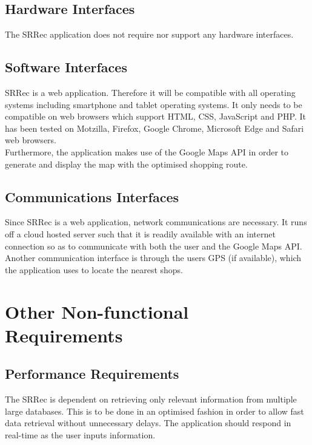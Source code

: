 \documentclass[10pt, a4paper, onecolumn]{scrartcl}
\begin{document}
		\subsection{Hardware Interfaces}
		
			The SRRec application does not require nor support any hardware interfaces.
		
		\subsection{Software Interfaces}
		
			SRRec is a web application. Therefore it will be compatible with all operating systems including smartphone and tablet operating systems. It only needs to be compatible on web browsers which support HTML, CSS, JavaScript and PHP. It has been tested on Motzilla, Firefox, Google Chrome, Microsoft Edge and Safari web browsers. \\
			
			Furthermore, the application makes use of the Google Maps API in order to generate and display the map with the optimised shopping route. 
		
		\subsection{Communications Interfaces}
		
			Since SRRec is a web application, network communications are necessary. It runs off a cloud hosted server such that it is readily available with an internet connection so as to communicate with both the user and the Google Maps API. Another communication interface is through the users GPS (if available), which the application uses to locate the nearest shops.
	
	\section{Other Non-functional Requirements}
	
		\subsection{Performance Requirements}
		
			The SRRec is dependent on retrieving only relevant information from multiple large databases. This is to be done in an optimised fashion in order to allow fast data retrieval without unnecessary delays. The application should respond in real-time as the user inputs information.\\
		
\end{document}
